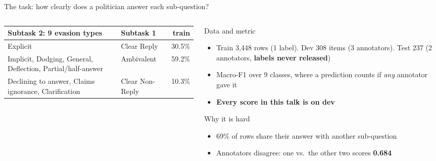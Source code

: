 \documentclass[aspectratio=169,10pt]{beamer}
\newcommand{\hl}[1]{\textcolor{accent}{\textbf{#1}}}
\begin{document}
\begin{frame}{The task: how clearly does a politician answer each sub-question?}
\begin{columns}[T]
\begin{column}{0.53\textwidth}
      {\small
      \renewcommand{\arraystretch}{1.08}
      \setlength{\tabcolsep}{3.5pt}
      \begin{tabular}{@{}>{\raggedright\arraybackslash}p{3.7cm} l r@{}}
        \toprule
        \textbf{Subtask 2}: 9 evasion types & \textbf{Subtask 1} & \textbf{train} \\
        \midrule
        Explicit & Clear Reply & 30.5\% \\
        \midrule
        Implicit, Dodging, General, Deflection, Partial/half-answer & Ambivalent & 59.2\% \\
        \midrule
        Declining to answer, Claims ignorance, Clarification & Clear Non-Reply & 10.3\% \\
        \bottomrule
      \end{tabular}}
    \end{column}
    \begin{column}{0.44\textwidth}
      \begin{block}{Data and metric}
        \small
        \begin{itemize}
          \item Train 3,448 rows (1 label). Dev 308 items (3 annotators). Test 237 (2 annotators, \hl{labels never released})
          \item Macro-F1 over 9 classes, where a prediction counts if \emph{any} annotator gave it
          \item \textbf{Every score in this talk is on dev}
        \end{itemize}
      \end{block}
      \begin{block}{Why it is hard}
        \small
        \begin{itemize}
          \item 69\% of rows share their answer with another sub-question
          \item Annotators disagree: one vs.\ the other two scores \hl{0.684}
        \end{itemize}
      \end{block}
    \end{column}
  \end{columns}
\end{frame}
\end{document}

